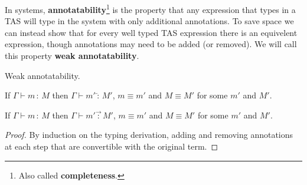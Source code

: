 In \bidir{} systems, \textbf{annotatability}\footnote{
  Also called \textbf{completeness}.
} is the property that any expression that types in a \ac{TAS} will type in the \bidir{} system with only additional annotations. 
To save space we can instead show that for every well typed \ac{TAS} expression there is an equivelent \bidir{} expression, though annotations may need to be added (or removed). %
We will call this property \textbf{weak annotatability}.
\begin{thm} Weak annotatability.
 
If $\Gamma\vdash m\,:\,M$ then $\Gamma\vdash m'\overleftarrow{\,:\,}M'$, $m\equiv m'$ and $M\equiv M'$ for some $m'$ and $M'$.
 
If $\Gamma\vdash m\,:\,M$ then $\Gamma\vdash m'\overrightarrow{\,:\,}M'$, $m\equiv m'$ and $M\equiv M'$ for some $m'$ and $M'$.
\end{thm}
 
\begin{proof}
By induction on the typing derivation, adding and removing annotations at each step that are convertible with the original term.
\end{proof}
